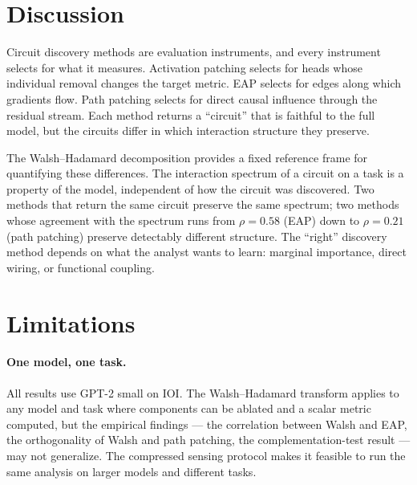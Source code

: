 \documentclass{article}
\begin{document}
%





\section{Discussion}
\label{sec:discussion}

Circuit discovery methods are evaluation instruments, and every
instrument selects for what it measures. Activation patching selects for
heads whose individual removal changes the target metric. EAP selects
for edges along which gradients flow. Path patching selects for direct
causal influence through the residual stream. Each method returns a
``circuit'' that is faithful to the full model, but the circuits differ
in which interaction structure they preserve.

The Walsh--Hadamard decomposition provides a fixed reference frame for
quantifying these differences. The interaction spectrum of a circuit on
a task is a property of the model, independent of how the circuit was
discovered. Two methods that return the same circuit preserve the same
spectrum; two methods whose agreement with the spectrum runs from
$\rho = 0.58$ (EAP) down to $\rho = 0.21$ (path patching) preserve
detectably different structure. The ``right'' discovery method depends on what
the analyst wants to learn: marginal importance, direct wiring, or
functional coupling.

\section{Limitations}
\label{sec:limitations}

\paragraph{One model, one task.}

All results use GPT-2 small on IOI. The Walsh--Hadamard transform
applies to any model and task where components can be ablated and a
scalar metric computed, but the empirical findings --- the correlation
between Walsh and EAP, the orthogonality of Walsh and path patching,
the complementation-test result --- may not generalize. The compressed
sensing protocol makes it feasible to run the same analysis on larger
models and different tasks.
\end{document}
